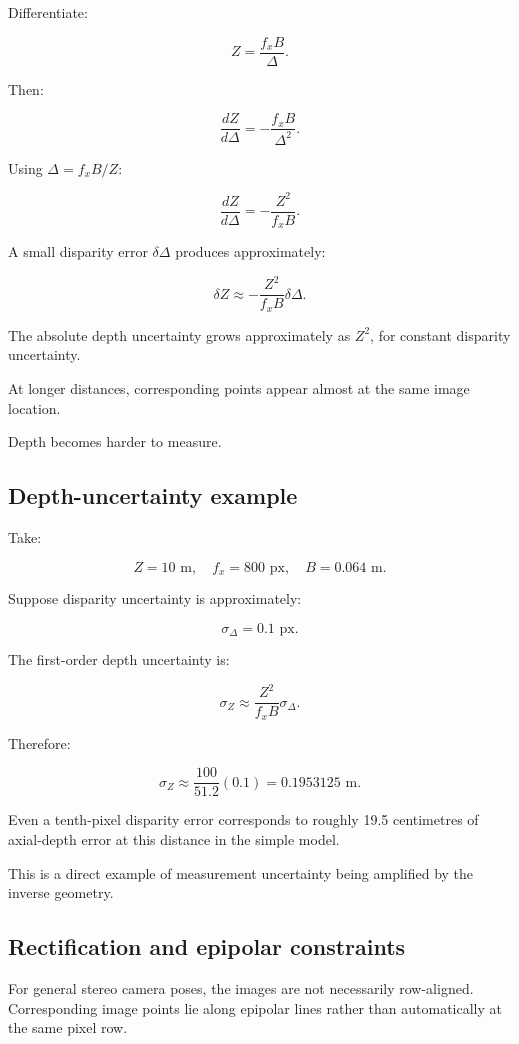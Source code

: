Differentiate:

\[ Z=\frac{f_xB}{\Delta}. \]

Then:

\[ \frac{dZ}{d\Delta} = -\frac{f_xB}{\Delta^2}. \]

Using \(\Delta=f_xB/Z\):

\[ \boxed{ \frac{dZ}{d\Delta} = -\frac{Z^2}{f_xB}. } \]

A small disparity error \(\delta\Delta\) produces approximately:

\[ \boxed{ \delta Z\approx -\frac{Z^2}{f_xB}\delta\Delta. } \]

The absolute depth uncertainty grows approximately as \(Z^2\), for constant disparity uncertainty.

At longer distances, corresponding points appear almost at the same image location.

Depth becomes harder to measure.

\subsection{Depth-uncertainty example}\label{02-foundations-ii-ch035-depth-uncertainty-example}

Take:

\[ Z=10\text{ m},\quad f_x=800\text{ px},\quad B=0.064\text{ m}. \]

Suppose disparity uncertainty is approximately:

\[ \sigma_\Delta=0.1\text{ px}. \]

The first-order depth uncertainty is:

\[ \sigma_Z\approx \frac{Z^2}{f_xB}\sigma_\Delta. \]

Therefore:

\[ \sigma_Z\approx \frac{100}{51.2}(0.1) =\boxed{0.1953125\text{ m}}. \]

Even a tenth-pixel disparity error corresponds to roughly 19.5 centimetres of axial-depth error at this distance in the simple model.

This is a direct example of measurement uncertainty being amplified by the inverse geometry.

\subsection{Rectification and epipolar constraints}\label{02-foundations-ii-ch035-rectification-and-epipolar-constraints}

For general stereo camera poses, the images are not necessarily row-aligned. Corresponding image points lie along epipolar lines rather than automatically at the same pixel row.


